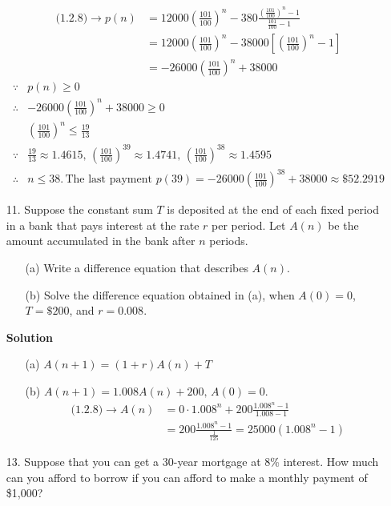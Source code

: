\begin{enumerate}
\begin{align*}
            \text{(1.2.8)}\to p(n) & =12000\left(\frac{101}{100}\right)^n-380\frac{(\frac{101}{100})^n-1}{\frac{101}{100}-1} \\
                                   & =12000\left(\frac{101}{100}\right)^n-38000\left[\left(\frac{101}{100}\right)^n-1\right] \\
                                   & =-26000\left(\frac{101}{100}\right)^n+38000
        \end{align*}
        \begin{align*}
            \because & p(n)\geq 0 \\
            \therefore & -26000\left(\frac{101}{100}\right)^n+38000\geq 0 \\
                       & \left(\frac{101}{100}\right)^n\leq\frac{19}{13} \\
            \because & \frac{19}{13}\approx 1.4615,\,\left(\frac{101}{100}\right)^{39}\approx 1.4741,\,\left(\frac{101}{100}\right)^{38}\approx 1.4595 \\
            \therefore & n\leq 38.\,\text{The last payment }p(39)=-26000\left(\frac{101}{100}\right)^{38}+38000\approx \$52.2919
        \end{align*}
    \item[11.] Suppose the constant sum $T$ is deposited at the end of each fixed period in a bank that pays interest at the rate $r$ per period. Let $A(n)$ be the amount accumulated in the bank after $n$ periods.
        \begin{itemize}
            \item[(a)] Write a difference equation that describes $A(n)$.
            \item[(b)] Solve the difference equation obtained in (a), when $A(0)=0$, $T=\$200$, and $r=0.008$.
        \end{itemize}
        \textbf{Solution}
        \begin{itemize}
            \item[(a)] $A(n+1)=(1+r)A(n)+T$
            \item[(b)] $A(n+1)=1.008A(n)+200,\,A(0)=0.$
                \begin{align*}
                    \text{(1.2.8)}\to A(n) & =0\cdot 1.008^n +200\frac{1.008^n -1}{1.008-1} \\
                                           & =200\frac{1.008^n -1}{\frac{1}{125}}=25000(1.008^n -1)
                \end{align*}
        \end{itemize}
    \item[13.] Suppose that you can get a 30-year mortgage at 8\% interest. How much can you afford to borrow if you can afford to make a monthly payment of \$1,000? \\

\end{enumerate}
